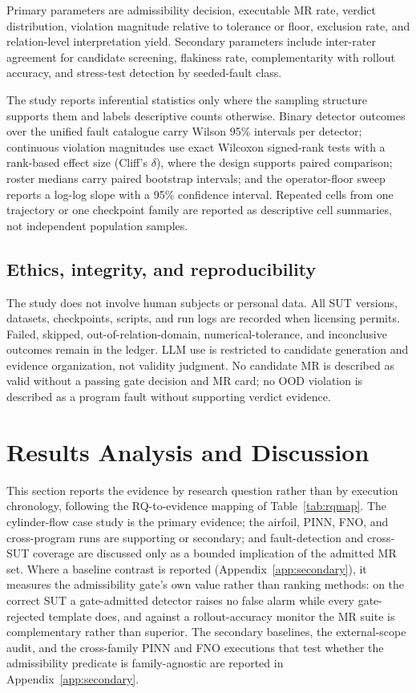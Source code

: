 \documentclass[preprint,12pt]{elsarticle}
\begin{document}
Primary parameters are admissibility decision, executable MR rate, verdict distribution, violation magnitude relative to tolerance or floor, exclusion rate, and relation-level interpretation yield. Secondary parameters include inter-rater agreement for candidate screening, flakiness rate, complementarity with rollout accuracy, and stress-test detection by seeded-fault class.

The study reports inferential statistics only where the sampling structure supports them and labels descriptive counts otherwise. Binary detector outcomes over the unified fault catalogue carry Wilson 95\% intervals per detector; continuous violation magnitudes use exact Wilcoxon signed-rank tests with a rank-based effect size (Cliff's $\delta$), where the design supports paired comparison; roster medians carry paired bootstrap intervals; and the operator-floor sweep reports a log-log slope with a 95\% confidence interval. Repeated cells from one trajectory or one checkpoint family are reported as descriptive cell summaries, not independent population samples.

\subsection{Ethics, integrity, and reproducibility}
\label{subsec:ethics}

The study does not involve human subjects or personal data. All SUT versions, datasets, checkpoints, scripts, and run logs are recorded when licensing permits. Failed, skipped, out-of-relation-domain, numerical-tolerance, and inconclusive outcomes remain in the ledger. LLM use is restricted to candidate generation and evidence organization, not validity judgment. No candidate MR is described as valid without a passing gate decision and MR card; no OOD violation is described as a program fault without supporting verdict evidence.

\section{Results Analysis and Discussion}
\label{sec:results}

This section reports the evidence by research question rather than by execution chronology, following the RQ-to-evidence mapping of Table~\ref{tab:rqmap}. The cylinder-flow case study is the primary evidence; the airfoil, PINN, FNO, and cross-program runs are supporting or secondary; and fault-detection and cross-SUT coverage are discussed only as a bounded implication of the admitted MR set. Where a baseline contrast is reported (Appendix~\ref{app:secondary}), it measures the admissibility gate's own value rather than ranking methods: on the correct SUT a gate-admitted detector raises no false alarm while every gate-rejected template does, and against a rollout-accuracy monitor the MR suite is complementary rather than superior. The secondary baselines, the external-scope audit, and the cross-family PINN and FNO executions that test whether the admissibility predicate is family-agnostic are reported in Appendix~\ref{app:secondary}.
\end{document}
